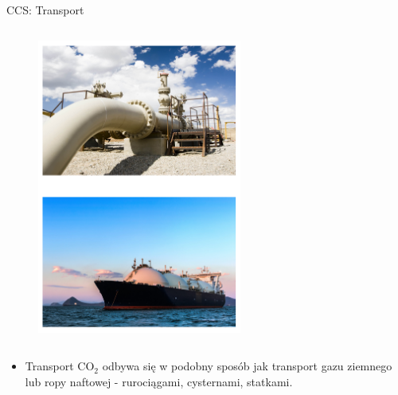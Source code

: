 \begin{columnframe}{CCS: Transport}
    \begin{column}{0.5\textwidth}
        \begin{figure}
            \centering
            \includegraphics[width=0.6\textwidth, frame]{images/co2_transport.png}
        \end{figure}
    \end{column}
    \begin{column}{0.5\textwidth}
        \begin{itemize}
            \item Transport CO$_2$
                  odbywa się w podobny sposób jak transport gazu ziemnego lub ropy naftowej - rurociągami, cysternami, statkami.
        \end{itemize}
    \end{column}
\end{columnframe}


